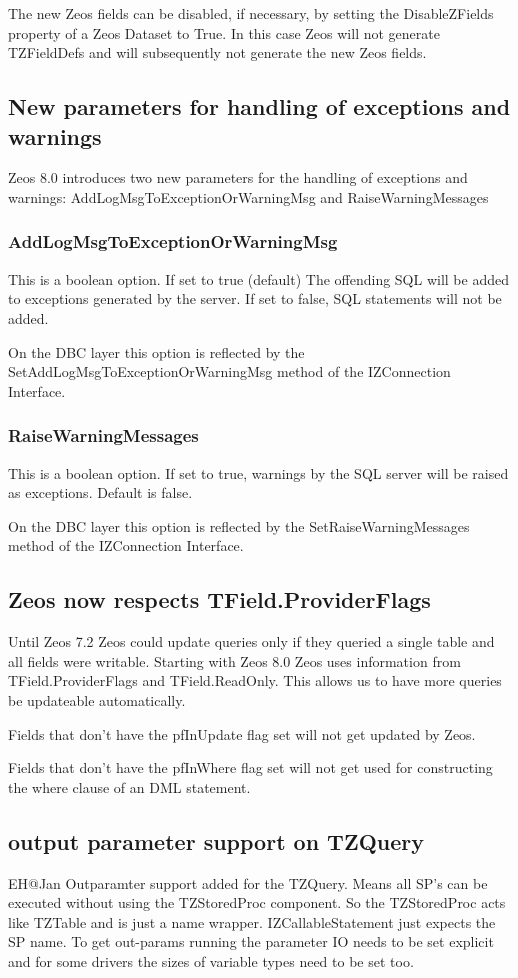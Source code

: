 \documentclass[a4paper,12pt,oneside]{article}
\begin{document}
The new Zeos fields can be disabled, if necessary, by setting the DisableZFields property of a Zeos Dataset to True.
In this case Zeos will not generate TZFieldDefs and will subsequently not generate the new Zeos fields.

\subsection{New parameters for handling of exceptions and warnings}
Zeos 8.0 introduces two new parameters for the handling of exceptions and warnings:
AddLogMsgToExceptionOrWarningMsg and RaiseWarningMessages

\subsubsection{AddLogMsgToExceptionOrWarningMsg }
This is a boolean option.
If set to true (default) The offending SQL will be added to exceptions generated by the server.
If set to false, SQL statements will not be added.

On the DBC layer this option is reflected by the SetAddLogMsgToExceptionOrWarningMsg method of the IZConnection Interface.

\subsubsection{RaiseWarningMessages}
This is a boolean option.
If set to true, warnings by the SQL server will be raised as exceptions.
Default is false.

On the DBC layer this option is reflected by the SetRaiseWarningMessages method of the IZConnection Interface.

\subsection{Zeos now respects TField.ProviderFlags}
Until Zeos 7.2 Zeos could update queries only if they queried a single table and all fields were writable.
Starting with Zeos 8.0 Zeos uses information from TField.ProviderFlags and TField.ReadOnly.
This allows us to have more queries be updateable automatically.

Fields that don't have the pfInUpdate flag set will not get updated by Zeos.

Fields that don't have the pfInWhere flag set will not get used for constructing the where clause of an DML statement.

\subsection{output parameter support on TZQuery}
EH@Jan Outparamter support added for the TZQuery.
Means all SP's can be executed without using the TZStoredProc component.
So the TZStoredProc acts like TZTable and is just a name wrapper.
IZCallableStatement just expects the SP name.
To get out-params running the parameter IO needs to be set explicit and for some drivers the sizes of variable types need to be set too.
\end{document}
